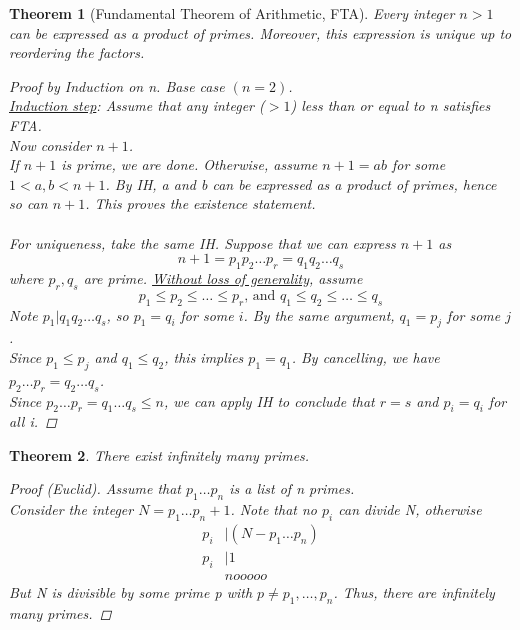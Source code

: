 \documentclass[letterpaper]{article}
\newtheorem{theorem}{Theorem}[section]
\begin{document}
    \begin{theorem} [Fundamental Theorem of Arithmetic, FTA]
        Every integer $n>1$ can be expressed as a product of primes. Moreover, this expression
        is unique up to reordering the factors.
        \begin{proof} [Proof by Induction on n]
            Base case $(n=2)$. \\
            \underline{Induction step}: Assume that any integer ($>1$) less than or equal
            to n satisfies FTA. \\
            Now consider $n+1$. \\
            If $n+1$ is prime, we are done. Otherwise, assume $n+1=ab$ for some $1<a,b<n+1$. 
            By IH, a and b can be expressed as a product of primes, hence so can $n+1$. 
            This proves the existence statement. \\\\
            For uniqueness, take the same IH. 
            Suppose that we can express $n+1$ as
            \[
                n+1=p_1p_2\dots p_r = q_1q_2\dots q_s
            \]
            where $p_r,q_s$ are prime. \underline{Without loss of generality}, assume
            \[
                p_1\leq p_2\leq\dots\leq p_r \text{, and } q_1\leq q_2\leq\dots\leq q_s
            \]
            Note $p_1|q_1q_2\dots q_s$, so $p_1=q_i$ for some $i$.
            By the same argument, $q_1=p_j$ for some $j$. \\
            Since $p_1\leq p_j$ and $q_1\leq q_2$, this implies $p_1=q_1$. 
            By cancelling, we have $p_2\dots p_r = q_2\dots q_s$. \\
            Since $p_2\dots p_r = q_1\dots q_s \leq n$, we can apply IH to conclude that
            $r=s$ and $p_i = q_i$ for all i.
        \end{proof}
    \end{theorem}

    \begin{theorem}
        There exist infinitely many primes.
        \begin{proof} [Proof (Euclid)]
            Assume that $p_1\dots p_n$ is a list of n primes. \\
            Consider the integer $N=p_1\dots p_n+1$.
            Note that no $p_i$ can divide N, otherwise 
            \begin{align*}
                p_i &| (N-p_1\dots p_n) \\
                p_i &| 1 \\
                & nooooo
            \end{align*}
            But N is divisible by some prime p with $p\neq p_1,\dots,p_n$. 
            Thus, there are infinitely many primes.
        \end{proof}
    \end{theorem}

        
\end{document}
